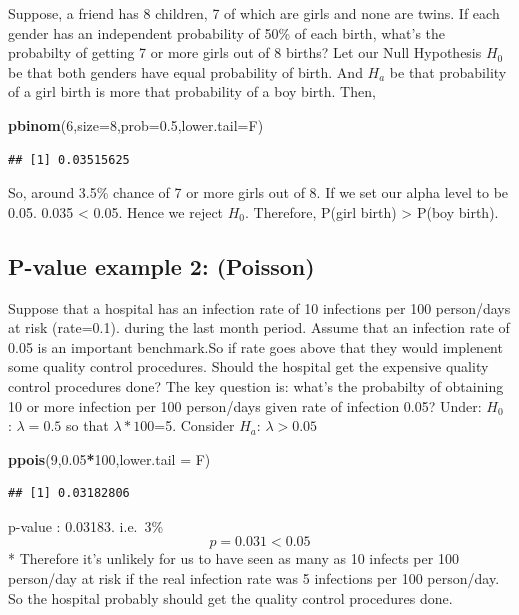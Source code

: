 \documentclass[]{article}
\newenvironment{Shaded}{\begin{snugshade}}{\end{snugshade}}
\newcommand{\DataTypeTok}[1]{\textcolor[rgb]{0.13,0.29,0.53}{#1}}
\newcommand{\DecValTok}[1]{\textcolor[rgb]{0.00,0.00,0.81}{#1}}
\newcommand{\FloatTok}[1]{\textcolor[rgb]{0.00,0.00,0.81}{#1}}
\newcommand{\KeywordTok}[1]{\textcolor[rgb]{0.13,0.29,0.53}{\textbf{#1}}}
\newcommand{\NormalTok}[1]{#1}
\newcommand{\OperatorTok}[1]{\textcolor[rgb]{0.81,0.36,0.00}{\textbf{#1}}}
\begin{document}
Suppose, a friend has 8 children, 7 of which are girls and none are
twins. If each gender has an independent probability of 50\% of each
birth, what's the probabilty of getting 7 or more girls out of 8 births?
Let our Null Hypothesis \(H_0\) be that both genders have equal
probability of birth. And \(H_a\) be that probability of a girl birth is
more that probability of a boy birth. Then,

\begin{Shaded}
\begin{Highlighting}[]
\KeywordTok{pbinom}\NormalTok{(}\DecValTok{6}\NormalTok{,}\DataTypeTok{size=}\DecValTok{8}\NormalTok{,}\DataTypeTok{prob=}\FloatTok{0.5}\NormalTok{,}\DataTypeTok{lower.tail=}\NormalTok{F)}
\end{Highlighting}
\end{Shaded}

\begin{verbatim}
## [1] 0.03515625
\end{verbatim}

So, around 3.5\% chance of 7 or more girls out of 8. If we set our alpha
level to be 0.05. 0.035 \textless{} 0.05. Hence we reject \(H_0\).
Therefore, P(girl birth) \textgreater{} P(boy birth).

\hypertarget{p-value-example-2-poisson}{%
\subsection{P-value example 2:
(Poisson)}\label{p-value-example-2-poisson}}

Suppose that a hospital has an infection rate of 10 infections per 100
person/days at risk (rate=0.1). during the last month period. Assume
that an infection rate of 0.05 is an important benchmark.So if rate goes
above that they would implenent some quality control procedures. Should
the hospital get the expensive quality control procedures done? The key
question is: what's the probabilty of obtaining 10 or more infection per
100 person/days given rate of infection 0.05? Under: \(H_0\) :
\(\lambda=0.5\) so that \(\lambda*100\)=5. Consider \(H_a\):
\(\lambda>0.05\)

\begin{Shaded}
\begin{Highlighting}[]
\KeywordTok{ppois}\NormalTok{(}\DecValTok{9}\NormalTok{,}\FloatTok{0.05}\OperatorTok{*}\DecValTok{100}\NormalTok{,}\DataTypeTok{lower.tail =}\NormalTok{ F)}
\end{Highlighting}
\end{Shaded}

\begin{verbatim}
## [1] 0.03182806
\end{verbatim}

p-value : 0.03183. i.e.~3\% \[p=0.031<0.05\] * Therefore it's unlikely
for us to have seen as many as 10 infects per 100 person/day at risk if
the real infection rate was 5 infections per 100 person/day. So the
hospital probably should get the quality control procedures done.
\end{document}
